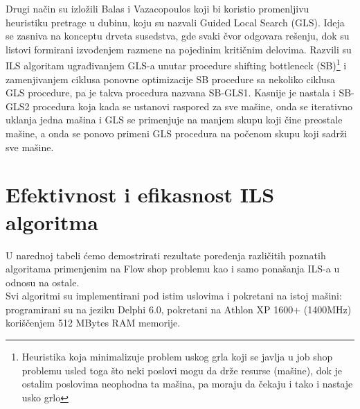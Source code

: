 \documentclass[a4paper]{article}
\begin{document}
Drugi način su izložili Balas i Vazacopoulos koji bi koristio promenljivu heuristiku pretrage u dubinu, koju su nazvali Guided Local Search (GLS). Ideja se zasniva na konceptu drveta susedstva, gde svaki čvor odgovara rešenju, dok su listovi formirani izvođenjem razmene na pojedinim kritičnim delovima. Razvili su ILS algoritam ugrađivanjem GLS-a unutar procedure shifting bottleneck (SB)\footnote{Heuristika koja minimalizuje problem uskog grla koji se javlja u job shop problemu usled toga što neki poslovi mogu da drže resurse (mašine), dok je ostalim poslovima neophodna ta mašina, pa moraju da čekaju i tako i nastaje usko grlo} i zamenjivanjem ciklusa ponovne optimizacije SB procedure sa nekoliko ciklusa GLS procedure, pa je takva procedura nazvana SB-GLS1. Kasnije je nastala i SB-GLS2 procedura koja kada se ustanovi raspored za sve mašine, onda se iterativno uklanja jedna mašina i GLS se primenjuje na manjem skupu koji čine preostale mašine, a onda se ponovo primeni GLS procedura na počenom skupu koji sadrži sve mašine.


\section{Efektivnost i efikasnost ILS algoritma}
U narednoj tabeli ćemo demostrirati rezultate poređenja različitih poznatih algoritama primenjenim na Flow shop problemu kao i samo ponašanja ILS-a u odnosu na ostale. \\
Svi algoritmi su implementirani pod istim uslovima i pokretani na istoj mašini: programirani su na jeziku Delphi 6.0, pokretani na Athlon XP 1600+ (1400MHz) koriščenjem 512 MBytes RAM memorije. 
\end{document}
